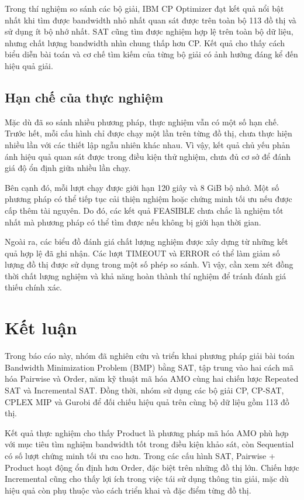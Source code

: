 \documentclass[a4paper,fleqn]{cas-sc}
\begin{document}
Trong thí nghiệm so sánh các bộ giải, IBM CP Optimizer đạt kết quả nổi bật nhất khi tìm được bandwidth nhỏ nhất quan sát được trên toàn bộ 113 đồ thị và sử dụng ít bộ nhớ nhất. SAT cũng tìm được nghiệm hợp lệ trên toàn bộ dữ liệu, nhưng chất lượng bandwidth nhìn chung thấp hơn CP. Kết quả cho thấy cách biểu diễn bài toán và cơ chế tìm kiếm của từng bộ giải có ảnh hưởng đáng kể đến hiệu quả giải.

\subsection{Hạn chế của thực nghiệm}

Mặc dù đã so sánh nhiều phương pháp, thực nghiệm vẫn có một số hạn chế. Trước hết, mỗi cấu hình chỉ được chạy một lần trên từng đồ thị, chưa thực hiện nhiều lần với các thiết lập ngẫu nhiên khác nhau. Vì vậy, kết quả chủ yếu phản ánh hiệu quả quan sát được trong điều kiện thử nghiệm, chưa đủ cơ sở để đánh giá độ ổn định giữa nhiều lần chạy.

Bên cạnh đó, mỗi lượt chạy được giới hạn 120 giây và 8 GiB bộ nhớ. Một số phương pháp có thể tiếp tục cải thiện nghiệm hoặc chứng minh tối ưu nếu được cấp thêm tài nguyên. Do đó, các kết quả FEASIBLE chưa chắc là nghiệm tốt nhất mà phương pháp có thể tìm được nếu không bị giới hạn thời gian.

Ngoài ra, các biểu đồ đánh giá chất lượng nghiệm được xây dựng từ những kết quả hợp lệ đã ghi nhận. Các lượt TIMEOUT và ERROR có thể làm giảm số lượng đồ thị được sử dụng trong một số phép so sánh. Vì vậy, cần xem xét đồng thời chất lượng nghiệm và khả năng hoàn thành thí nghiệm để tránh đánh giá thiếu chính xác.

\section{Kết luận}

Trong báo cáo này, nhóm đã nghiên cứu và triển khai phương pháp giải bài toán Bandwidth Minimization Problem (BMP) bằng SAT, tập trung vào hai cách mã hóa Pairwise và Order, năm kỹ thuật mã hóa AMO cùng hai chiến lược Repeated SAT và Incremental SAT. Đồng thời, nhóm sử dụng các bộ giải CP, CP-SAT, CPLEX MIP và Gurobi để đối chiếu hiệu quả trên cùng bộ dữ liệu gồm 113 đồ thị.

Kết quả thực nghiệm cho thấy Product là phương pháp mã hóa AMO phù hợp với mục tiêu tìm nghiệm bandwidth tốt trong điều kiện khảo sát, còn Sequential có số lượt chứng minh tối ưu cao hơn. Trong các cấu hình SAT, Pairwise + Product hoạt động ổn định hơn Order, đặc biệt trên những đồ thị lớn. Chiến lược Incremental cũng cho thấy lợi ích trong việc tái sử dụng thông tin giải, mặc dù hiệu quả còn phụ thuộc vào cách triển khai và đặc điểm từng đồ thị.
\end{document}
